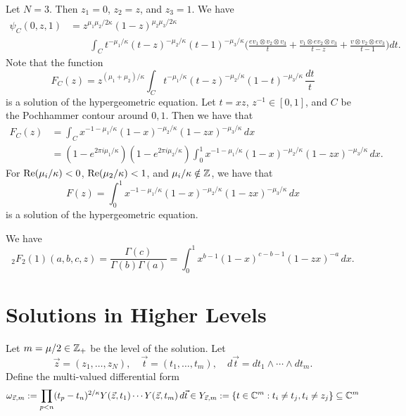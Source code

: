 \begin{example}
  Let $N = 3$. Then $z_1 = 0$, $z_2 = z$, and
  $z_3 = 1$. We have
  \begin{align*}
    \psi_C(0, z, 1)
    &= z^{\mu_1 \mu_2 / 2 \kappa}
    (1 - z)^{\mu_2 \mu_3 / 2 \kappa} \\
    &\quad \quad \int_C t^{-\mu_1 / \kappa}
    (t - z)^{-\mu_2 / \kappa}
    (t - 1)^{-\mu_3 / \kappa}
    \bigg(\frac{ev_1 \otimes v_2 \otimes v_3}{t} + \frac{v_1 \otimes ev_2 \otimes v_3}{t - z} + \frac{v \otimes v_2 \otimes e v_3}{t - 1}\bigg) dt.
  \end{align*}
  Note that the function
  \[
    F_C(z)
    = z^{(\mu_1 + \mu_2) / \kappa}
    \int_C t^{-\mu_1 / \kappa}
    (t - z)^{-\mu_2 / \kappa}
    (1 - t)^{-\mu_3 / \kappa}\, \frac{dt}{t}
  \]
  is a solution of the hypergeometric
  equation.
  Let $t = xz$, $z^{-1} \in [0, 1]$, and
  $C$ be the Pochhammer contour around
  $0, 1$. Then we have that
  \begin{align*}
    F_C(z)
    &= \int_C x^{-1 - \mu_1 / \kappa}
    (1 - x)^{-\mu_2 / \kappa}
    (1 - zx)^{-\mu_3 / \kappa}\, dx \\
    &= (1 - e^{2\pi i \mu_1 / \kappa})(1 - e^{2\pi i \mu_2 / \kappa})
    \int_0^1 x^{-1 - \mu_1 / \kappa}
    (1 - x)^{-\mu_2 / \kappa}
    (1 - zx)^{-\mu_3 / \kappa}\, dx.
  \end{align*}
  For $\operatorname{Re}(\mu_i / \kappa) < 0$,
  $\operatorname{Re}(\mu_2 / \kappa) < 1$, and $\mu_i / \kappa \notin \mathbb{Z}$,
  we have that
  \[
    F(z)
    = \int_{0}^1
    x^{-1 - \mu_1 / \kappa}
    (1 - x)^{-\mu_2 / \kappa}
    (1 - zx)^{-\mu_3 / \kappa}\, dx
  \]
  is a solution of the hypergeometric equation.
\end{example}

\begin{prop}
  We have
  \[
    {}_{2}F_2(1)(a, b, c, z)
    = \frac{\Gamma(c)}{\Gamma(b) \Gamma(a)}
    = \int_0^1 x^{b - 1} (1 - x)^{c - b - 1} (1 - zx)^{-a}\, dx.
  \]
\end{prop}

\section{Solutions in Higher Levels}

\begin{remark}
  Let $m = \mu / 2 \in \mathbb{Z}_+$ be the level of
  the solution. Let
  \[\vec{z} = (z_1, \dots, z_N), \quad
  \vec{t} = (t_1, \dots, t_m), \quad
  d\vec{t} = dt_1 \wedge \cdots \wedge dt_m.
  \]
  Define the multi-valued differential form
  \[
    \omega_{\vec{z}, m}
    := 
    \prod_{p < n}(t_p - t_n)^{2 / \kappa}
    Y(\vec{z}, t_1) \cdots Y(\vec{z}, t_m) \, d\vec{t}
    \in Y_{\vec{z}, m}
    := \{t \in \mathbb{C}^m : t_i \ne t_j, t_i \ne z_j\} \subseteq \mathbb{C}^m
  \]
\end{remark}

